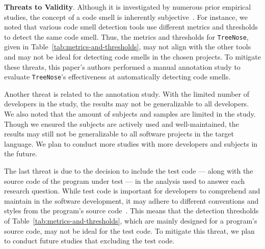 {\bf Threats to Validity}.
%
Although it is investigated by numerous prior empirical studies, the concept of
a code smell is inherently subjective~\cite{Fowler_Beck}.
%
For instance, we noted that various code smell detection tools use different
metrics and thresholds to detect the same code smell. Thus, the metrics and
thresholds for \texttt{TreeNose}, given in
Table~\ref{tab:metrics-and-thresholds}, may not align with the other tools and
may not be ideal for detecting code smells in the chosen projects.
%
%
To mitigate these threats, this paper's authors performed a manual annotation
study to evaluate \texttt{TreeNose}'s effectiveness at automatically detecting
code smells.

%
Another threat is related to the annotation study. With the limited number of
developers in the study, the results may not be generalizable to all developers.
We also noted that the amount of subjects and samples are limited in the study.
Though we ensured the subjects are actively used and well-maintained, the
results may still not be generalizable to all software projects in the target
language. We plan to conduct more studies with more developers and subjects in
the future.






The last threat is due to the decision to include the test code --- along with
the source code of the program under test --- in the analysis used to answer
each research question. While test code is important for developers to
comprehend and maintain in the software development, it may adhere to different
conventions and styles from the program's source
code~\cite{Kapfhammer2004,Kapfhammer2010}. This means that the detection
thresholds of Table~\ref{tab:metrics-and-thresholds}, which are mainly designed
for a program's source code, may not be ideal for the test code. To mitigate
this threat, we plan to conduct future studies that excluding the test code.
